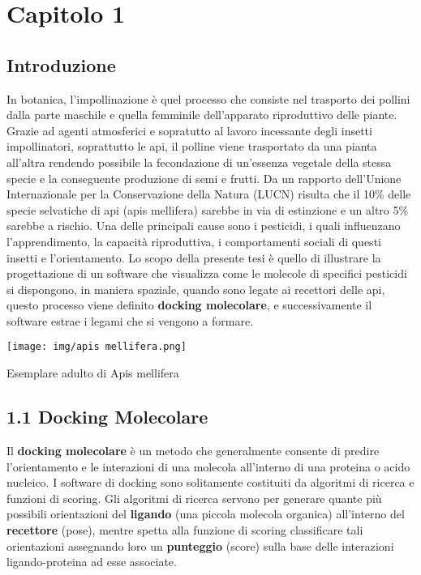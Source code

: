 \def\baselinestretch{1}
\chapter*{Capitolo 1} \label{cap1}

\section*{Introduzione}
\def\baselinestretch{1.66}
\noindent In botanica, l’impollinazione è quel processo che consiste nel trasporto dei pollini dalla parte maschile e quella femminile dell’apparato riproduttivo delle piante. Grazie ad agenti atmosferici e sopratutto al lavoro incessante degli insetti impollinatori, soprattutto le api, il polline viene trasportato da una pianta all’altra rendendo possibile la fecondazione di un’essenza vegetale della stessa specie e la conseguente produzione di semi e frutti. Da un rapporto dell’Unione Internazionale per la Conservazione della Natura (LUCN) risulta che il 10\% delle specie selvatiche di api (apis mellifera) sarebbe in via di estinzione e un altro 5\% sarebbe a rischio. Una delle principali cause sono i pesticidi, i quali influenzano l’apprendimento, la capacità riproduttiva, i comportamenti sociali di questi insetti e l'orientamento. \newline
\noindent Lo scopo della presente tesi è quello di illustrare la progettazione di un software che visualizza come le molecole di specifici pesticidi si dispongono, in maniera spaziale, quando sono legate ai recettori delle api, questo processo viene definito \textbf{docking molecolare}, e successivamente il software estrae i legami che si vengono a formare. 

\begin{center}
\texttt{[image: img/apis mellifera.png]}
\footnotesize \centerline {Esemplare adulto di Apis mellifera}
\end{center}


\section*{1.1 Docking Molecolare}
\def\baselinestretch{1.66}
\noindent Il \textbf{docking molecolare} è un metodo che generalmente consente di predire l’orientamento e le interazioni di una molecola all’interno di una proteina o acido nucleico. I software di docking sono solitamente costituiti da algoritmi di ricerca e funzioni di scoring. Gli algoritmi di ricerca servono per generare quante più possibili orientazioni del \textbf{ligando} (una piccola molecola organica) all’interno del \textbf{recettore} (pose), mentre spetta alla funzione di scoring classificare tali orientazioni assegnando loro un \textbf{punteggio} (score) sulla base delle interazioni ligando-proteina ad esse associate.

